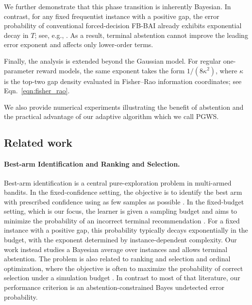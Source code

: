 \documentclass[10pt]{article}
\newcommand{\ouralg}{{\textnormal{\textsc{PGWS}}}}
\theoremstyle{plain}
\begin{document}
We further demonstrate that this phase transition is inherently Bayesian. In contrast, for any fixed frequentist instance with a positive gap, the error probability of conventional forced-decision FB-BAI already exhibits exponential decay in $T$; see, e.g., \citet{karnin2013almost}. As a result, terminal abstention cannot improve the leading error exponent and affects only lower-order terms.

Finally, the analysis is extended beyond the Gaussian model. For regular
one-parameter reward models, the same exponent takes the form
\(1/(8\kappa^2)\), where \(\kappa\) is the top-two gap density evaluated in Fisher--Rao information coordinates; see Eqn.~\eqref{eqn:fisher_rao}.

We also provide numerical experiments illustrating the benefit of abstention and the practical advantage of our adaptive algorithm which we call \ouralg{}.













\subsection{Related work}
\label{subsec:related-work}

\paragraph{Best-arm Identification and Ranking and Selection.}
Best-arm identification is a central pure-exploration problem in multi-armed
bandits. In the fixed-confidence setting, the objective is to identify the best
arm with prescribed confidence using as few samples as possible 
\citep{banditAlg,even-dar2006action,kaufmann2016complexity}. In the fixed-budget setting,
which is our focus, the learner is given a sampling budget and aims to minimize
the probability of an incorrect terminal recommendation
\citep{audibert2010best,karnin2013almost,carpentier2016tight,
komiyama2022minimax,wang2023large}. For a fixed instance with a positive gap,
this probability typically decays exponentially in the budget, with the exponent
determined by instance-dependent complexity. Our work instead studies a Bayesian
average over instances and allows terminal abstention. The problem is also
related to ranking and selection and ordinal optimization, where the objective is
often to maximize the probability of correct selection under a simulation budget
\citep{chen2000simulation,glynn2004large,hong2021review}. In contrast to most of
that literature, our performance criterion is an abstention-constrained Bayes undetected error probability.
\end{document}
